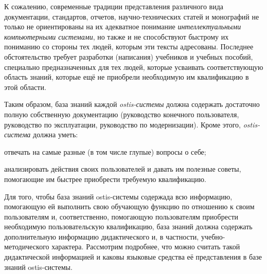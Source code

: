 К сожалению, современные традиции представления различного вида документации, стандартов, отчетов, научно-технических статей и монографий не только не ориентированы на их адекватное понимание \textit{интеллектуальными компьютерными системами}, но также и не способствуют быстрому их пониманию со стороны тех людей, которым эти тексты адресованы. Последнее обстоятельство требует разработки (написания) учебников и учебных пособий, специально предназначенных для тех людей, которые  усваивать соответствующую область знаний, которые ещё не приобрели необходимую им квалификацию в этой области.

Таким образом, база знаний каждой \textit{ostis-системы} должна содержать достаточно полную собственную документацию (руководство конечного пользователя, руководство по эксплуатации, руководство по модернизации). Кроме этого, \textit{ostis-система} должна уметь:
\begin{textitemize}
	\item отвечать на самые разные (в том числе глупые) вопросы о себе;
	\item анализировать действия своих пользователей и давать им полезные советы, помогающие им быстрее приобрести требуемую квалификацию.
\end{textitemize}

Для того, чтобы база знаний ostis-системы содержада всю информацию, помогающую ей выполнить свою обучающую функцию по отношению к своим пользователям и, соответственно, помогающую пользователям  приобрести необходимую пользовательскую квалификацию, база знаний должна содержать дополнительную информацию дидактического и, в частности, учебно-методического характера. Рассмотрим подробнее, что можно считать такой дидактической информацией и каковы языковые средства её представления в базе знаний ostis-системы.

